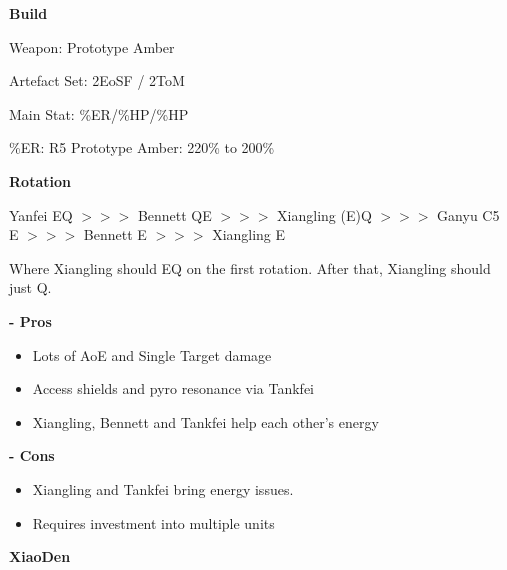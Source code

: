 \documentclass[11pt]{article}
\begin{document}
\textbf{\small{Build}}

Weapon: Prototype Amber 

Artefact Set: 2EoSF / 2ToM 

Main Stat: \%ER/\%HP/\%HP 

\%ER: R5 Prototype Amber: 220\% to 200\%

\textbf{\small{Rotation}} 

\begin{center}
    Yanfei EQ $>>>$ Bennett QE $>>>$ Xiangling (E)Q $>>>$ Ganyu C5 E $>>>$ Bennett E $>>>$ Xiangling E
\end{center} 
\begin{center} 
    Where Xiangling should EQ on the first rotation. After that, Xiangling should just Q. 
\end{center}

\textbf{\small{- Pros}}

\begin{itemize}
    \item Lots of AoE and Single Target damage
    \item Access shields and pyro resonance via Tankfei
    \item Xiangling, Bennett and Tankfei help each other's energy
\end{itemize}

\textbf{\small{- Cons}}

\begin{itemize}
    \item Xiangling and Tankfei bring energy issues.
    \item Requires investment into multiple units
\end{itemize}

\newpage

\textbf{XiaoDen}
\end{document}
